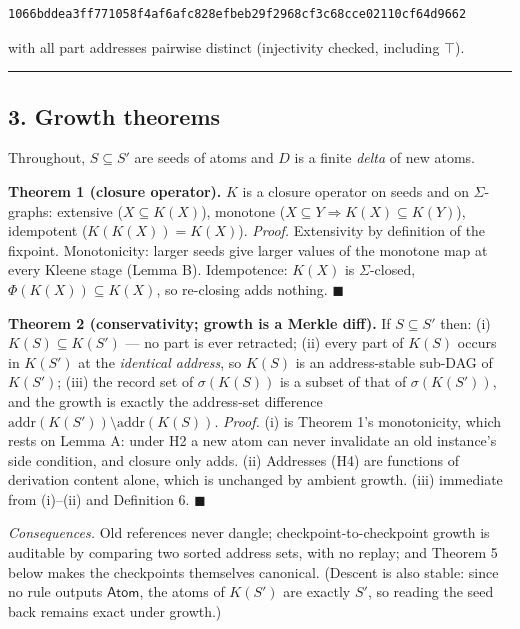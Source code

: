 \documentclass[
  10pt,
]{article}
\begin{document}
\begin{verbatim}
1066bddea3ff771058f4af6afc828efbeb29f2968cf3c68cce02110cf64d9662
\end{verbatim}

with all part addresses pairwise distinct (injectivity checked,
including \(\top\)).

\begin{center}\rule{0.5\linewidth}{0.5pt}\end{center}

\hypertarget{growth-theorems}{%
\subsection{3. Growth theorems}\label{growth-theorems}}

Throughout, \(S \subseteq S'\) are seeds of atoms and \(D\) is a finite
\emph{delta} of new atoms.

\textbf{Theorem 1 (closure operator).} \(K\) is a closure operator on
seeds and on \(\Sigma\)-graphs: extensive (\(X \subseteq K(X)\)),
monotone (\(X \subseteq Y \Rightarrow K(X) \subseteq K(Y)\)), idempotent
(\(K(K(X)) = K(X)\)). \emph{Proof.} Extensivity by definition of the
fixpoint. Monotonicity: larger seeds give larger values of the monotone
map at every Kleene stage (Lemma B). Idempotence: \(K(X)\) is
\(\Sigma\)-closed, \(\Phi(K(X)) \subseteq K(X)\), so re-closing adds
nothing. \(\blacksquare\)

\textbf{Theorem 2 (conservativity; growth is a Merkle diff).} If
\(S \subseteq S'\) then: (i) \(K(S) \subseteq K(S')\) --- no part is
ever retracted; (ii) every part of \(K(S)\) occurs in \(K(S')\) at the
\emph{identical address}, so \(K(S)\) is an address-stable sub-DAG of
\(K(S')\); (iii) the record set of \(\sigma(K(S))\) is a subset of that
of \(\sigma(K(S'))\), and the growth is exactly the address-set
difference \(\mathrm{addr}(K(S')) \setminus \mathrm{addr}(K(S))\).
\emph{Proof.} (i) is Theorem 1's monotonicity, which rests on Lemma A:
under H2 a new atom can never invalidate an old instance's side
condition, and closure only adds. (ii) Addresses (H4) are functions of
derivation content alone, which is unchanged by ambient growth. (iii)
immediate from (i)--(ii) and Definition 6. \(\blacksquare\)

\emph{Consequences.} Old references never dangle;
checkpoint-to-checkpoint growth is auditable by comparing two sorted
address sets, with no replay; and Theorem 5 below makes the checkpoints
themselves canonical. (Descent is also stable: since no rule outputs
\(\mathsf{Atom}\), the atoms of \(K(S')\) are exactly \(S'\), so reading
the seed back remains exact under growth.)
\end{document}
